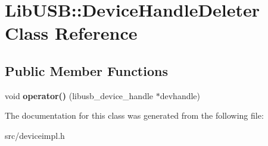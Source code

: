 \hypertarget{class_lib_u_s_b_1_1_device_handle_deleter}{\section{Lib\-U\-S\-B\-:\-:Device\-Handle\-Deleter Class Reference}
\label{class_lib_u_s_b_1_1_device_handle_deleter}
}
\subsection*{Public Member Functions}
\begin{DoxyCompactItemize}
\item 
\hypertarget{class_lib_u_s_b_1_1_device_handle_deleter_a5e92bf38e288eb355a2996afeaa8cedf}{void {\bfseries operator()} (libusb\-\_\-device\-\_\-handle $\ast$devhandle)}\label{class_lib_u_s_b_1_1_device_handle_deleter_a5e92bf38e288eb355a2996afeaa8cedf}

\end{DoxyCompactItemize}


The documentation for this class was generated from the following file\-:\begin{DoxyCompactItemize}
\item 
src/deviceimpl.\-h\end{DoxyCompactItemize}
